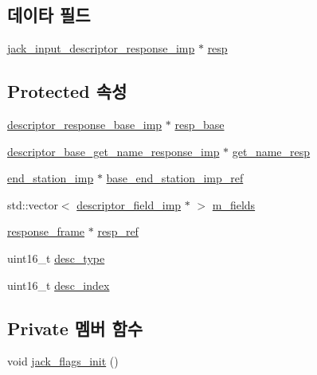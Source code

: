 \subsection*{데이타 필드}
\begin{DoxyCompactItemize}
\item 
\hyperlink{classavdecc__lib_1_1jack__input__descriptor__response__imp}{jack\+\_\+input\+\_\+descriptor\+\_\+response\+\_\+imp} $\ast$ \hyperlink{classavdecc__lib_1_1jack__input__descriptor__imp_ab92c6d00a7cf65013d2329e305907e43}{resp}
\end{DoxyCompactItemize}
\subsection*{Protected 속성}
\begin{DoxyCompactItemize}
\item 
\hyperlink{classavdecc__lib_1_1descriptor__response__base__imp}{descriptor\+\_\+response\+\_\+base\+\_\+imp} $\ast$ \hyperlink{classavdecc__lib_1_1descriptor__base__imp_a8b104da8319cda946944548ebb9552f4}{resp\+\_\+base}
\item 
\hyperlink{classavdecc__lib_1_1descriptor__base__get__name__response__imp}{descriptor\+\_\+base\+\_\+get\+\_\+name\+\_\+response\+\_\+imp} $\ast$ \hyperlink{classavdecc__lib_1_1descriptor__base__imp_a7d3a410eb242dc2b7abe9862a1593458}{get\+\_\+name\+\_\+resp}
\item 
\hyperlink{classavdecc__lib_1_1end__station__imp}{end\+\_\+station\+\_\+imp} $\ast$ \hyperlink{classavdecc__lib_1_1descriptor__base__imp_a550c969411f5f3b69f55cc139763d224}{base\+\_\+end\+\_\+station\+\_\+imp\+\_\+ref}
\item 
std\+::vector$<$ \hyperlink{classavdecc__lib_1_1descriptor__field__imp}{descriptor\+\_\+field\+\_\+imp} $\ast$ $>$ \hyperlink{classavdecc__lib_1_1descriptor__base__imp_adce67136eb9c66da9c189b730077b9cd}{m\+\_\+fields}
\item 
\hyperlink{classavdecc__lib_1_1response__frame}{response\+\_\+frame} $\ast$ \hyperlink{classavdecc__lib_1_1descriptor__base__imp_a2642e3a7c10d38553e7ff4a55e875346}{resp\+\_\+ref}
\item 
uint16\+\_\+t \hyperlink{classavdecc__lib_1_1descriptor__base__imp_a9dada313309522d04f1e52fe887442b4}{desc\+\_\+type}
\item 
uint16\+\_\+t \hyperlink{classavdecc__lib_1_1descriptor__base__imp_a2bbd0d8f32f687ca36aaa543c06f764c}{desc\+\_\+index}
\end{DoxyCompactItemize}
\subsection*{Private 멤버 함수}
\begin{DoxyCompactItemize}
\item 
void \hyperlink{classavdecc__lib_1_1jack__input__descriptor__imp_a6de95e6c9b0a71154f1451a6a19da19f}{jack\+\_\+flags\+\_\+init} ()
\end{DoxyCompactItemize}


